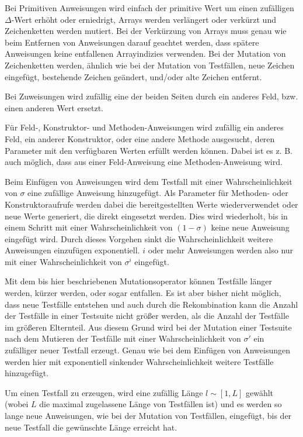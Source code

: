 \documentclass[a4paper,11pt]{article}
\begin{document}
Bei Primitiven Anweisungen wird einfach der primitive Wert um einen zufälligen $\Delta$-Wert erhöht oder erniedrigt, Arrays werden verlängert oder verkürzt und Zeichenketten werden mutiert.
Bei der Verkürzung von Arrays muss genau wie beim Entfernen von Anweisungen darauf geachtet werden, dass spätere Anweisungen keine entfallenen Arrayindizies verwenden.
Bei der Mutation von Zeichenketten werden, ähnlich wie bei der Mutation von Testfällen, neue Zeichen eingefügt, bestehende Zeichen geändert, und/oder alte Zeichen entfernt.

Bei Zuweisungen wird zufällig eine der beiden Seiten durch ein anderes Feld, bzw. einen anderen Wert ersetzt.

Für Feld-, Konstruktor- und Methoden-Anweisungen wird zufällig ein anderes Feld, ein anderer Konstruktor, oder eine andere Methode ausgesucht, deren Parameter mit den verfügbaren Werten erfüllt werden können.
Dabei ist es z. B. auch möglich, dass aus einer Feld-Anweisung eine Methoden-Anweisung wird.

Beim Einfügen von Anweisungen wird dem Testfall mit einer Wahrscheinlichkeit von $\sigma$ eine zufällige Anweisung hinzugefügt.
Als Parameter für Methoden- oder Konstruktoraufrufe werden dabei die bereitgestellten Werte wiederverwendet oder neue Werte generiert, die direkt eingesetzt werden.
Dies wird wiederholt, bis in einem Schritt mit einer Wahrscheinlichkeit von $(1 - \sigma)$ keine neue Anweisung eingefügt wird.
Durch dieses Vorgehen sinkt die Wahrscheinlichkeit weitere Anweisungen einzufügen exponentiell.
$i$ oder mehr Anweisungen werden also nur mit einer Wahrscheinlichkeit von $\sigma^i$ eingefügt.

Mit dem bis hier beschriebenen Mutationsoperator können Testfälle länger werden, kürzer werden, oder sogar entfallen.
Es ist aber bisher nicht möglich, dass neue Testfälle entstehen und auch durch die Rekombination kann die Anzahl der Testfälle in einer Testsuite nicht größer werden, als die Anzahl der Testfälle im größeren Elternteil.
Aus diesem Grund wird bei der Mutation einer Testsuite nach dem Mutieren der Testfälle mit einer Wahrscheinlichkeit von $\sigma'$ ein zufälliger neuer Testfall erzeugt.
Genau wie bei dem Einfügen von Anweisungen werden hier mit exponentiell sinkender Wahrscheinlichkeit weitere Testfälle hinzugefügt.

Um einen Testfall zu erzeugen, wird eine zufällig Länge $l \sim [1, L]$ gewählt (wobei $L$ die maximal zugelassene Länge von Testfällen ist) und es werden so lange neue Anweisungen, wie bei der Mutation von Testfällen, eingefügt, bis der neue Testfall die gewünschte Länge erreicht hat.
\end{document}
